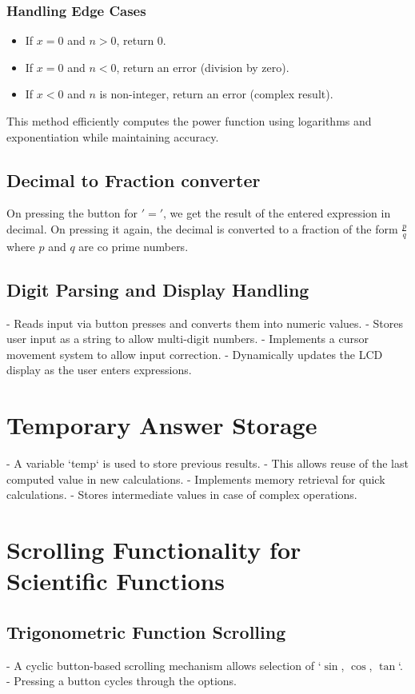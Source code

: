 \documentclass{article}
\begin{document}
\subsubsection{Handling Edge Cases}
\begin{itemize}
    \item If $x = 0$ and $n > 0$, return $0$.
    \item If $x = 0$ and $n < 0$, return an error (division by zero).
    \item If $x < 0$ and $n$ is non-integer, return an error (complex result).
\end{itemize}

This method efficiently computes the power function using logarithms and exponentiation while maintaining accuracy.

\subsection{Decimal to Fraction converter}
On pressing the button for $'='$, we get the result of the entered expression in decimal. On pressing it again, the decimal is converted to a fraction of the form $\frac{p}{q}$ where $p$ and $q$ are co prime numbers.


\subsection{Digit Parsing and Display Handling}
- Reads input via button presses and converts them into numeric values.
- Stores user input as a string to allow multi-digit numbers.
- Implements a cursor movement system to allow input correction.
- Dynamically updates the LCD display as the user enters expressions.

\section{Temporary Answer Storage}
- A variable `temp` is used to store previous results.
- This allows reuse of the last computed value in new calculations.
- Implements memory retrieval for quick calculations.
- Stores intermediate values in case of complex operations.

\section{Scrolling Functionality for Scientific Functions}
\subsection{Trigonometric Function Scrolling}
- A cyclic button-based scrolling mechanism allows selection of `$\sin$, $\cos$, $\tan$`.
- Pressing a button cycles through the options.
\end{document}
